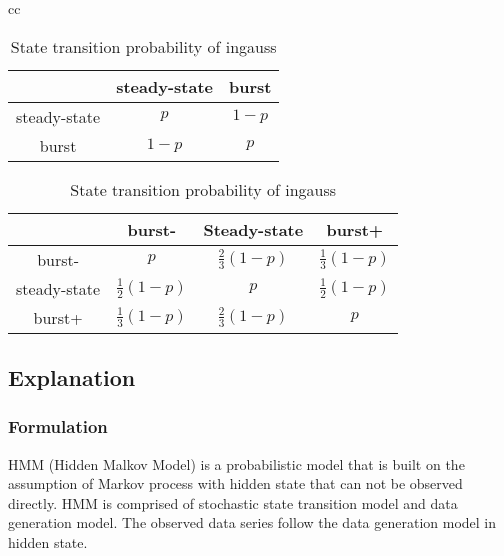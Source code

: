 \begin{table}[htbp]
\begin{center}
\begin{tabular}{cc}

\begin{minipage}{0.5\hsize}
\begin{center}
\caption{State transition probability of exp, poisson, binom\label{tbl:initProb}}
{\small
\begin{tabular}{ccc}
\hline
&steady-state&burst\\
\hline
steady-state & $p$   & $1-p$ \\
burst & $1-p$ & $p$   \\
\hline
\end{tabular} 
}
\end{center}
\end{minipage}

\begin{minipage}{0.5\hsize}
\begin{center}
\caption{State transition probability of ingauss\label{tbl:initProb}}
{\small
\begin{tabular}{cccc}
\hline
& burst- &Steady-state&burst+\\
\hline
burst- & $p$                & $\frac{2}{3}(1-p)$ & $\frac{1}{3}(1-p)$ \\
steady-state   & $\frac{1}{2}(1-p)$ & $p$                & $\frac{1}{2}(1-p)$ \\
burst+ & $\frac{1}{3}(1-p)$ & $\frac{2}{3}(1-p)$ & $p$                \\
\hline
\end{tabular} 
}
\end{center}
\end{minipage}

\end{tabular} 
\end{center}
\end{table} 



\subsection*{Explanation}
\subsubsection*{Formulation}
HMM (Hidden Malkov Model) is a probabilistic model that is built on the assumption of Markov process with hidden state that can not be observed directly.
HMM is comprised of stochastic state transition model and data generation model. The observed data series follow the data generation model in hidden state.


